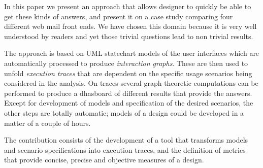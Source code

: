 \documentclass{sigchi}
\begin{document}
In this paper we present an approach that allows designer to quickly
be able to get these kinds of answers, and present it on a case study
comparing four different web mail front ends. We have chosen this
domain because it is very well understood by readers and yet those
trivial questions lead to non trivial results.

The approach is based on UML statechart models of the user interfaces
which are automatically processed to produce \emph{interaction
  graphs}. These are then used to unfold \emph{execution traces} that
are dependent on the specific usage scenarios being considered in the
analysis. On traces several graph-theoretic computations can be
performed to produce a dhasboard of different results that provide the
answers. Except for development of models and specification of the
desired scenarios, the other steps are totally automatic; models of a
design could be developed in a matter of a couple of hours.

The contribution consists of the development of a tool that transforms
models and scenario specifications into execution traces, and the
definition of metrics that provide concise, precise and objective
measures of a design.



\end{document}
